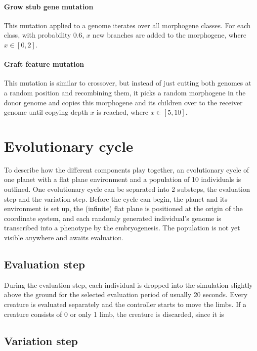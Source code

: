 \documentclass[main]{subfiles}
\begin{document}
\paragraph{Grow stub gene mutation}

This mutation applied to a genome iterates over all morphogene classes. For each class, with probability $0.6$, $x$ new branches are added to the morphogene, where $x \in [0,2]$.

\paragraph{Graft feature mutation}

This mutation is similar to crossover, but instead of just cutting both genomes at a random position and recombining them, it picks a random morphogene in the donor genome and copies this morphogene and its children over to the receiver genome until copying depth $x$ is reached, where $x \in [5,10]$.

\section{Evolutionary cycle}

To describe how the different components play together, an evolutionary cycle of one planet with a flat plane environment and a population of 10 individuals is outlined. One evolutionary cycle can be separated into 2 substeps, the evaluation step and the variation step. Before the cycle can begin, the planet and its environment is set up, the (infinite) flat plane is positioned at the origin of the coordinate system, and each randomly generated individual's genome is transcribed into a phenotype by the embryogenesis. The population is not yet visible anywhere and awaits evaluation.


\subsection{Evaluation step}

During the evaluation step, each individual is dropped into the simulation slightly above the ground for the selected evaluation period of usually 20 seconds. Every creature is evaluated separately and the controller starts to move the limbs. If a creature consists of 0 or only 1 limb, the creature is discarded, since it is


\subsection{Variation step}

\lipsum[18]
\end{document}
